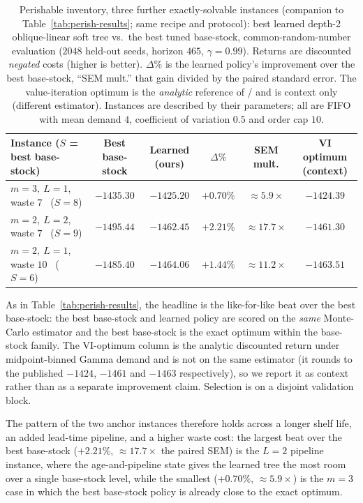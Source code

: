 \documentclass[11pt]{article}
\begin{document}
\begin{table}[!htbp]
\centering
\small
\caption{Perishable inventory, three further exactly-solvable instances (companion to
Table~\ref{tab:perish-results}; same recipe and protocol): best learned depth-2 oblique-linear
soft tree vs.\ the best tuned base-stock, common-random-number evaluation ($2048$ held-out seeds,
horizon $465$, $\gamma=0.99$). Returns are discounted \emph{negated} costs (higher is better).
$\Delta\%$ is the learned policy's improvement over the best base-stock, ``SEM mult.'' that gain divided by
the paired standard error. The value-iteration optimum is the \emph{analytic} reference of
\citet{deMoor2022perishable} / \citet{farrington2025perishable} and is context only (different
estimator). Instances are described by their parameters; all are FIFO with mean demand $4$,
coefficient of variation $0.5$ and order cap $10$.}
\label{tab:perish-results-more}
\begin{tabular}{lccccc}
\toprule
Instance ($S$ = best base-stock) & Best base-stock & Learned (ours) & $\Delta\%$ & SEM mult. & VI optimum (context) \\
\midrule
$m=3,\ L=1$, waste $7$ \ ($S=8$)            & $-1435.30$ & $\mathbf{-1425.20}$ & $\mathbf{+0.70\%}$ & $\approx 5.9\times$  & $-1424.39$ \\
$m=2,\ L=2$, waste $7$ \ ($S=9$)            & $-1495.44$ & $\mathbf{-1462.45}$ & $\mathbf{+2.21\%}$ & $\approx 17.7\times$ & $-1461.30$ \\
$m=2,\ L=1$, waste $10$ \ ($S=6$)           & $-1485.40$ & $\mathbf{-1464.06}$ & $\mathbf{+1.44\%}$ & $\approx 11.2\times$ & $-1463.51$ \\
\bottomrule
\end{tabular}
\par\medskip\footnotesize As in Table~\ref{tab:perish-results}, the headline is the like-for-like
beat over the best base-stock: the best base-stock and learned policy are scored on the \emph{same} Monte-Carlo estimator and the best base-stock
is the exact optimum within the base-stock family. The VI-optimum column is the analytic discounted
return under midpoint-binned Gamma demand and is not on the same estimator (it rounds to the published
$-1424$, $-1461$ and $-1463$ respectively), so we report it as context rather than as a separate
improvement claim. Selection is on a disjoint validation block.
\end{table}
\FloatBarrier

\noindent
The pattern of the two anchor instances therefore holds across a longer shelf life, an added lead-time
pipeline, and a higher waste cost: the largest beat over the best base-stock ($+2.21\%$, $\approx17.7\times$ the paired SEM)
is the $L=2$ pipeline instance, where the age-and-pipeline state gives the learned tree the most room
over a single base-stock level, while the smallest ($+0.70\%$, $\approx5.9\times$) is the $m=3$ case in
which the best base-stock policy is already close to the exact optimum.
\end{document}
